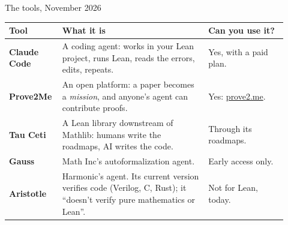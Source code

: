 \documentclass[10pt, aspectratio=169]{beamer}
\begin{document}
\begin{frame}[fragile]{The tools, November 2026}
\renewcommand{\arraystretch}{1.15}
\small
\begin{tabular}{@{}>{\bfseries}p{0.15\linewidth}>{\raggedright\arraybackslash}p{0.5\linewidth}>{\raggedright\arraybackslash}p{0.27\linewidth}@{}}
\toprule
Tool & What it is & Can you use it?\\\midrule
Claude Code & A coding agent: works in your Lean project, runs Lean, reads the errors, edits, repeats. & Yes, with a paid plan.\\
Prove2Me & An open platform: a paper becomes a \emph{mission}, and anyone's agent can contribute proofs. & Yes: \href{https://prove2.me}{prove2.me}.\\
Tau Ceti & A Lean library downstream of Mathlib: humans write the roadmaps, AI writes the code. & Through its roadmaps.\\
Gauss & Math Inc's autoformalization agent. & Early access only.\\
Aristotle & Harmonic's agent. Its current version verifies code (Verilog, C, Rust); it ``doesn't verify pure mathematics or Lean''. & Not for Lean, today.\\
\bottomrule
\end{tabular}

\end{frame}
\end{document}
